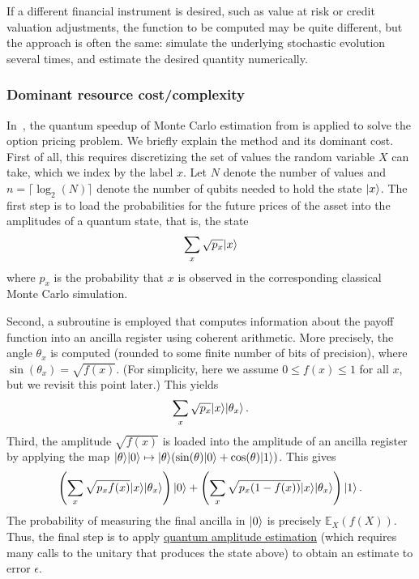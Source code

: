 \begin{refsection}
If a different financial instrument is desired, such as value at risk or credit valuation adjustments, the function to be computed may be quite different, but the approach is often the same: simulate the underlying stochastic evolution several times, and estimate the desired quantity numerically.


\subsubsection*{Dominant resource cost/complexity}

In~\cite{rebentrost2018MonteCarloDerivatives,stamatopoulos2020option}, the quantum speedup of Monte Carlo estimation from \cite{montanaro2015QMonteCarlo} is applied to solve the option pricing problem. We briefly explain the method and its dominant cost. First of all, this requires discretizing the set of values the random variable $X$ can take, which we index by the label $x$. Let $N$ denote the number of values and $n = \lceil \log_2(N) \rceil$ denote the number of qubits needed to hold the state $\lvert x\rangle$. The first step is to load the probabilities for the future prices of the asset into the amplitudes of a quantum state, that is, the state
\begin{equation}
    \sum_x \sqrt{p_x} \lvert x\rangle
\end{equation}
where $p_x$ is the probability that $x$ is observed in the corresponding classical Monte Carlo simulation. 

Second, a subroutine is employed that computes information about the payoff function into an ancilla register using coherent arithmetic. More precisely, the angle $\theta_x$ is computed (rounded to some finite number of bits of precision), where $\sin(\theta_x) = \sqrt{f(x)}$. (For simplicity, here we assume $0 \leq f(x) \leq 1$ for all $x$, but we revisit this point later.)
This yields 
\begin{equation}
    \sum_x \sqrt{p_x} \lvert x\rangle\lvert\theta_x\rangle\,.
\end{equation}
Third, the amplitude $\sqrt{f(x)}$ is loaded into the amplitude of an ancilla register by applying the map $\lvert\theta\rangle\lvert0\rangle \mapsto \lvert\theta\rangle(\sin(\theta) \lvert0\rangle + \cos(\theta)\lvert1\rangle)$. This gives
\begin{equation}\label{eq:option_pricing_state}
    \left(\sum_x \sqrt{p_xf(x)} \lvert x\rangle\lvert\theta_x\rangle\right)\lvert0\rangle + \left(\sum_x \sqrt{p_x(1-f(x))} \lvert x\rangle\lvert\theta_x\rangle\right)\lvert1\rangle\,.
\end{equation}
The probability of measuring the final ancilla in $\lvert0\rangle$ is precisely $\mathbb{E}_X(f(X))$. Thus, the final step is to apply \hyperref[prim:AmpEst]{quantum amplitude estimation} (which requires many calls to the unitary that produces the state above) to obtain an estimate to error $\epsilon$. 


\end{refsection}
